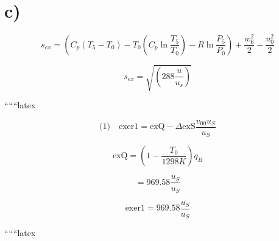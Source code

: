 

\section*{c)}

\[
s_{ex} = (C_p (T_5 - T_0) - T_0 (C_p \ln \frac{T_5}{T_0}) - R \ln \frac{P_5}{P_0}) + \frac{w_6^2}{2} - \frac{u_0^2}{2}
\]

\[
s_{ex} = \sqrt{(288 \frac{u}{u_s})}
\]

``````latex


\[
\text{(1)} \quad \text{exer1} = \text{exQ} - \Delta \text{exS} \frac{v_{00} u_{S}}{u_{S}}
\]

\[
\text{exQ} = \left(1 - \frac{T_0}{1298K}\right) q_B
\]

\[
= 969.58 \frac{u_{S}}{u_{S}}
\]

\[
\text{exer1} = 969.58 \frac{u_{S}}{u_{S}}
\]

``````latex